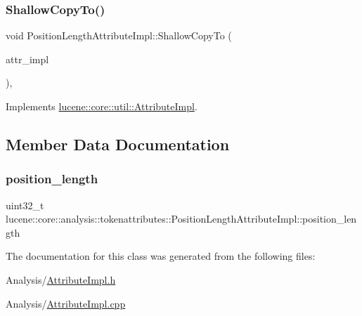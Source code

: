 \subsubsection{\texorpdfstring{Shallow\+Copy\+To()}{ShallowCopyTo()}}
{\footnotesize\ttfamily void Position\+Length\+Attribute\+Impl\+::\+Shallow\+Copy\+To (\begin{DoxyParamCaption}\item[{\mbox{\hyperlink{classlucene_1_1core_1_1util_1_1AttributeImpl}{lucene\+::core\+::util\+::\+Attribute\+Impl}} \&}]{attr\+\_\+impl }\end{DoxyParamCaption})\hspace{0.3cm}{\ttfamily [override]}, {\ttfamily [virtual]}}



Implements \mbox{\hyperlink{classlucene_1_1core_1_1util_1_1AttributeImpl_a010e8937832f53139c8fe42757476895}{lucene\+::core\+::util\+::\+Attribute\+Impl}}.



\subsection{Member Data Documentation}
\mbox{\label{classlucene_1_1core_1_1analysis_1_1tokenattributes_1_1PositionLengthAttributeImpl_a12c90fb7e49f9b4043bfc09d66ef816d}} 
\subsubsection{\texorpdfstring{position\+\_\+length}{position\_length}}
{\footnotesize\ttfamily uint32\+\_\+t lucene\+::core\+::analysis\+::tokenattributes\+::\+Position\+Length\+Attribute\+Impl\+::position\+\_\+length\hspace{0.3cm}{\ttfamily [private]}}



The documentation for this class was generated from the following files\+:\begin{DoxyCompactItemize}
\item 
Analysis/\mbox{\hyperlink{AttributeImpl_8h}{Attribute\+Impl.\+h}}\item 
Analysis/\mbox{\hyperlink{AttributeImpl_8cpp}{Attribute\+Impl.\+cpp}}\end{DoxyCompactItemize}
